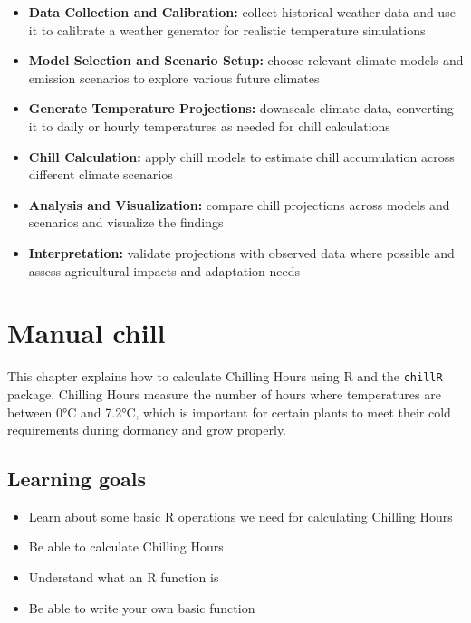 \documentclass[
]{article}
\providecommand{\tightlist}{%
  \setlength{\itemsep}{0pt}\setlength{\parskip}{0pt}}
\begin{document}
\begin{itemize}
\item
  \textbf{Data Collection and Calibration:} collect historical weather data and use it to calibrate a weather generator for realistic temperature simulations
\item
  \textbf{Model Selection and Scenario Setup:} choose relevant climate models and emission scenarios to explore various future climates
\item
  \textbf{Generate Temperature Projections:} downscale climate data, converting it to daily or hourly temperatures as needed for chill calculations
\item
  \textbf{Chill Calculation:} apply chill models to estimate chill accumulation across different climate scenarios
\item
  \textbf{Analysis and Visualization:} compare chill projections across models and scenarios and visualize the findings
\item
  \textbf{Interpretation:} validate projections with observed data where possible and assess agricultural impacts and adaptation needs
\end{itemize}

\section{Manual chill}\label{manual-chill}

This chapter explains how to calculate Chilling Hours using R and the \texttt{chillR} package. Chilling Hours measure the number of hours where temperatures are between 0°C and 7.2°C, which is important for certain plants to meet their cold requirements during dormancy and grow properly.

\subsection{Learning goals}\label{learning-goals-3}

\begin{itemize}
\tightlist
\item
  Learn about some basic R operations we need for calculating Chilling Hours
\item
  Be able to calculate Chilling Hours
\item
  Understand what an R function is
\item
  Be able to write your own basic function
\end{itemize}
\end{document}
